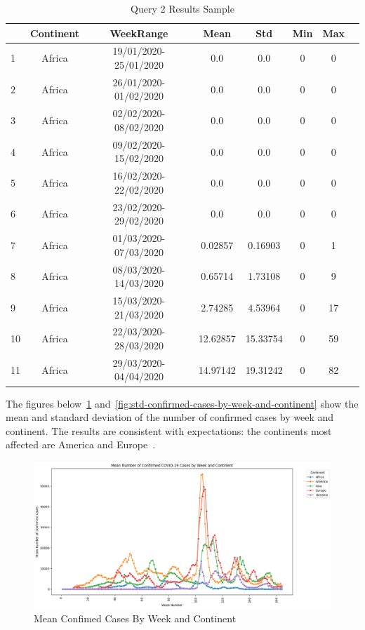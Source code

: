 \documentclass[12pt,oneside]{book} %
\begin{document}
\begin{table}[H]
    \centering
    \captionsetup{font=large}
    \caption{Query 2 Results Sample}
    \normalsize
    \begin{tabular}{|l|c|c|c|c|c|c|c|}
        \hline
           & Continent & WeekRange             & Mean     & Std      & Min & Max \\
        \hline
        1  & Africa    & 19/01/2020-25/01/2020 & 0.0      & 0.0      & 0   & 0   \\
        2  & Africa    & 26/01/2020-01/02/2020 & 0.0      & 0.0      & 0   & 0   \\
        3  & Africa    & 02/02/2020-08/02/2020 & 0.0      & 0.0      & 0   & 0   \\
        4  & Africa    & 09/02/2020-15/02/2020 & 0.0      & 0.0      & 0   & 0   \\
        5  & Africa    & 16/02/2020-22/02/2020 & 0.0      & 0.0      & 0   & 0   \\
        6  & Africa    & 23/02/2020-29/02/2020 & 0.0      & 0.0      & 0   & 0   \\
        7  & Africa    & 01/03/2020-07/03/2020 & 0.02857  & 0.16903  & 0   & 1   \\
        8  & Africa    & 08/03/2020-14/03/2020 & 0.65714  & 1.73108  & 0   & 9   \\
        9  & Africa    & 15/03/2020-21/03/2020 & 2.74285  & 4.53964  & 0   & 17  \\
        10 & Africa    & 22/03/2020-28/03/2020 & 12.62857 & 15.33754 & 0   & 59  \\
        11 & Africa    & 29/03/2020-04/04/2020 & 14.97142 & 19.31242 & 0   & 82  \\
        \hline
    \end{tabular}\label{tab:query2-results-sample}
\end{table}

\newpage

The figures below~\ref{fig:mean-confirmed-cases-by-week-and-continent}
and~\ref{fig:std-confirmed-cases-by-week-and-continent} show the mean and
standard deviation of the number of confirmed cases by week and continent. The
results are consistent with expectations: the continents most affected are
America and Europe~\cite{NYT}.

\begin{figure}[H]
    \centering
    \includegraphics[width=1\textwidth]{images/mean-confirmed-cases-by-week-and-continent.png}
    \caption{Mean Confimed Cases By Week and Continent}\label{fig:mean-confirmed-cases-by-week-and-continent}
\end{figure}
\end{document}
